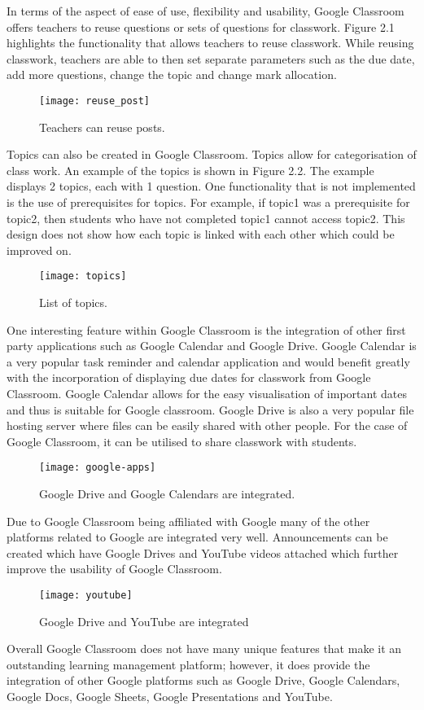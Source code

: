 In terms of the aspect of ease of use, flexibility and usability, Google Classroom offers teachers to reuse questions or sets of questions for classwork.
Figure 2.1 highlights the functionality that allows teachers to reuse classwork. 
While reusing classwork, teachers are able to then set separate parameters such as the due date, add more questions, change the topic and change mark allocation.

\begin{figure}[h]
    \centering
    \texttt{[image: reuse\_post]}
    \caption{Teachers can reuse posts.}
\end{figure}

Topics can also be created in Google Classroom.
Topics allow for categorisation of class work. 
An example of the topics is shown in Figure 2.2. 
The example displays 2 topics, each with 1 question. 
One functionality that is not implemented is the use of prerequisites for topics. 
For example, if topic1 was a prerequisite for topic2, then students who have not completed topic1 cannot access topic2. 
This design does not show how each topic is linked with each other which could be improved on.

\begin{figure}[h]
    \centering
    \texttt{[image: topics]}
    \caption{List of topics.}
\end{figure}

One interesting feature within Google Classroom is the integration of other first party applications such as Google Calendar and Google Drive. 
Google Calendar is a very popular task reminder and calendar application and would benefit greatly with the incorporation of displaying due dates for classwork from Google Classroom. 
Google Calendar allows for the easy visualisation of important dates and thus is suitable for Google classroom. 
Google Drive is also a very popular file hosting server where files can be easily shared with other people. 
For the case of Google Classroom, it can be utilised to share classwork with students.

\begin{figure}[h]
    \centering
    \texttt{[image: google-apps]}
    \caption{Google Drive and Google Calendars are integrated.}
\end{figure}

Due to Google Classroom being affiliated with Google many of the other platforms related to Google are integrated very well. 
Announcements can be created which have Google Drives and YouTube videos attached which further improve the usability of Google Classroom.

\begin{figure}[h]
    \centering
    \texttt{[image: youtube]}
    \caption{Google Drive and YouTube are integrated}
\end{figure}

Overall Google Classroom does not have many unique features that make it an outstanding learning management platform; however, it does provide the integration of other Google platforms such as Google Drive, Google Calendars, Google Docs, Google Sheets, Google Presentations and YouTube.
